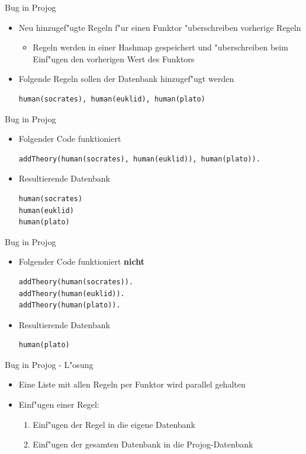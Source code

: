 \documentclass[18pt]{beamer}
\begin{document}
\begin{frame}[fragile]{Bug in Projog}
\begin{itemize}
\item Neu hinzugef"ugte Regeln f"ur einen Funktor "uberschreiben vorherige Regeln
\begin{itemize}
\item Regeln werden in einer Hashmap gespeichert und "uberschreiben beim Einf"ugen den vorherigen Wert des Funktors
\end{itemize}
\vspace{0.5cm}
\item Folgende Regeln sollen der Datenbank hinzugef"ugt werden
\begin{verbatim}
human(socrates), human(euklid), human(plato)
\end{verbatim}
\end{itemize}
\end{frame}
\begin{frame}[fragile]{Bug in Projog}
\begin{itemize}
\item Folgender Code funktioniert
\begin{verbatim}
addTheory(human(socrates), human(euklid)), human(plato)).
\end{verbatim}
\vspace{0.5cm}
\item Resultierende Datenbank
\begin{verbatim}
human(socrates)
human(euklid)
human(plato)
\end{verbatim}
\end{itemize}
\end{frame}
\begin{frame}[fragile]{Bug in Projog}
\begin{itemize}
\item Folgender Code funktioniert \textbf{nicht}
\begin{verbatim}
addTheory(human(socrates)).
addTheory(human(euklid)).
addTheory(human(plato)).
\end{verbatim}
\vspace{0.5cm}
\item Resultierende Datenbank
\begin{verbatim}
human(plato)
\end{verbatim}
\end{itemize}
\end{frame}
\begin{frame}{Bug in Projog - L"osung}
\begin{itemize}
\item Eine Liste mit allen Regeln per Funktor wird parallel gehalten
\vspace{0.5cm}
\item Einf"ugen einer Regel:
\begin{enumerate}
\item Einf"ugen der Regel in die eigene Datenbank
\item Einf"ugen der gesamten Datenbank in die Projog-Datenbank
\end{enumerate}
\end{itemize}
\end{frame}
\end{document}
